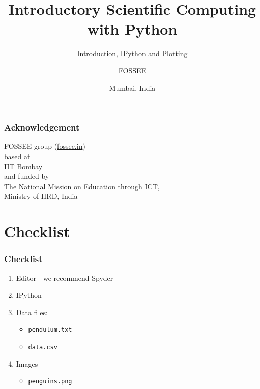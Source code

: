 \documentclass[14pt,compress]{beamer}
\title[Interactive Plotting]{Introductory Scientific Computing with
Python}
\subtitle{Introduction, IPython and Plotting}
\author[FOSSEE] {FOSSEE}
\institute[IIT Bombay] {Department of Aerospace Engineering\\IIT Bombay}
\date[] {Mumbai, India
}
\newcommand{\typ}[1]{\lstinline{#1}}
\begin{document}
\begin{frame}
  \maketitle
\end{frame}


\begin{frame}
    \frametitle{Acknowledgement}
    \Large
    \begin{center}
        \alert{FOSSEE group (\url{fossee.in})} \\
        based at\\
        \alert{IIT Bombay}\\
        and funded by\\
        The National Mission on Education through ICT, \\
        \alert{Ministry of HRD, India}
    \end{center}
\end{frame}

\section{Checklist}
\begin{frame}
\frametitle{Checklist}
  \begin{enumerate}
    \item Editor - we recommend \alert{Spyder}
    \item IPython
    \item Data files:
      \begin{itemize}
      \item \typ{pendulum.txt}
      \item \typ{data.csv}
      \end{itemize}
    \item Images
      \begin{itemize}
      \item \typ{penguins.png}
      \end{itemize}
  \end{enumerate}
\end{frame}
\end{document}
